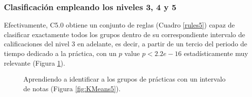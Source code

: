 \subsubsection{Clasificación empleando los niveles 3, 4 y 5}

Efectivamente, C5.0 obtiene un conjunto de reglas (Cuadro \ref{rules5}) capaz de clasificar exactamente todos los grupos dentro de su correspondiente intervalo de calificaciones del nivel $3$ en adelante, es decir, a partir de un tercio del periodo de tiempo dedicado a la práctica, con un $p$ value $p < 2.2e-16$ estadísticamente muy relevante (Figura \ref{fig:cm5}).

\begin{figure}[H]
\centering
{}
\caption{Aprendiendo a identificar a los grupos de prácticas con un intervalo de notas (Figura \ref{fig:KMeans5}).}
\label{fig:cm5}
\end{figure}


